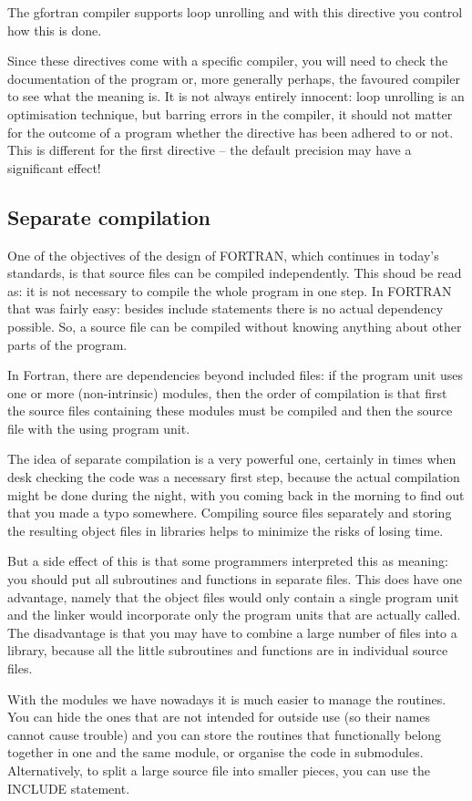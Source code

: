 The gfortran compiler supports loop unrolling and with this directive you control how this is done.

Since these directives come with a specific compiler, you will need to check the documentation of
the program or, more generally perhaps, the favoured compiler to see what the meaning is. It is not
always entirely innocent: loop unrolling is an optimisation technique, but barring errors in the
compiler, it should not matter for the outcome of a program whether the directive has been adhered
to or not. This is different for the first directive -- the default precision may have a significant
effect!


\subsection{Separate compilation}
One of the objectives of the design of FORTRAN, which continues in today's standards, is that
source files can be compiled independently. This shoud be read as: it is not necessary to
compile the whole program in one step. In FORTRAN that was fairly easy: besides include statements
there is no actual dependency possible. So, a source file can be compiled without knowing anything
about other parts of the program.

In Fortran, there are dependencies beyond included files: if the program unit uses one or more
(non-intrinsic) modules, then the order of compilation is that first the source files containing
these modules must be compiled and then the source file with the using program unit.

The idea of separate compilation is a very powerful one, certainly in times when desk checking
the code was a necessary first step, because the actual compilation might be done during the night,
with you coming back in the morning to find out that you made a typo somewhere. Compiling source files
separately and storing the resulting object files in libraries helps to minimize the risks of
losing time.

But a side effect of this is that some programmers interpreted this as meaning: you should put all
subroutines and functions in separate files. This does have one advantage, namely that the object files
would only contain a single program unit and the linker would incorporate only the program units
that are actually called. The disadvantage is that you may have to combine a large number of
files into a library, because all the little subroutines and functions are in individual source files.

With the modules we have nowadays it is much easier to manage the routines. You can hide the ones
that are not intended for outside use (so their names cannot cause trouble) and you can store
the routines that functionally belong together in one and the same module, or organise the code
in submodules. Alternatively, to split a large source file into smaller pieces, you can use the INCLUDE statement.
